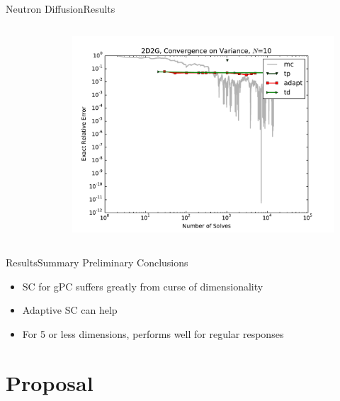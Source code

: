 \documentclass{beamer}
\begin{document}
\begin{frame}{Neutron Diffusion}{Results}
\begin{columns}
\begin{column}{0.3\textwidth}
\begin{figure}[h!]
    \end{figure}
  \end{column}
  \begin{column}{0.3\textwidth}
    \begin{figure}[h!]
      \centering
      \includegraphics[width=\textwidth]{../../graphics/2D2G_varconv_10}
    \end{figure}
  \end{column}
  \end{columns}
\end{frame}

\begin{frame}{Results}{Summary}\vspace{-20pt}
  Preliminary Conclusions\vspace{20pt}
  \begin{itemize}
    \item SC for gPC suffers greatly from curse of dimensionality\vspace{10pt}
    \item Adaptive SC can help\vspace{10pt}
    \item For 5 or less dimensions, performs well for regular responses
  \end{itemize}
\end{frame}

\section{Proposal}
\end{document}
